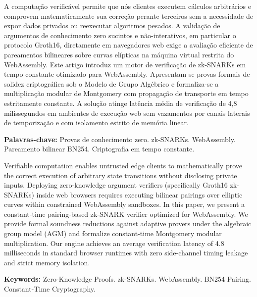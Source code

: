 \documentclass[
  article,
  12pt,
  oneside,
  a4paper,
  english,
  brazil
]{abntex2}
\begin{document}

\maketitle

\begin{resumoumacoluna}
A computação verificável permite que nós clientes executem cálculos arbitrários e comprovem matematicamente sua correção perante terceiros sem a necessidade de expor dados privados ou reexecutar algoritmos pesados. A validação de argumentos de conhecimento zero sucintos e não-interativos, em particular o protocolo Groth16, diretamente em navegadores web exige a avaliação eficiente de pareamentos bilineares sobre curvas elípticas na máquina virtual restrita do WebAssembly. Este artigo introduz um motor de verificação de zk-SNARKs em tempo constante otimizado para WebAssembly. Apresentam-se provas formais de solidez criptográfica sob o Modelo de Grupo Algébrico e formaliza-se a multiplicação modular de Montgomery com propagação de transporte em tempo estritamente constante. A solução atinge latência média de verificação de 4,8 milissegundos em ambientes de execução web sem vazamentos por canais laterais de temporização e com isolamento estrito de memória linear.

\vspace{\onelineskip}
\noindent
\textbf{Palavras-chave:} Provas de conhecimento zero. zk-SNARKs. WebAssembly. Pareamento bilinear BN254. Criptografia em tempo constante.
\end{resumoumacoluna}

\begin{resumoumacoluna}[Abstract]
Verifiable computation enables untrusted edge clients to mathematically prove the correct execution of arbitrary state transitions without disclosing private inputs. Deploying zero-knowledge argument verifiers (specifically Groth16 zk-SNARKs) inside web browsers requires executing bilinear pairings over elliptic curves within constrained WebAssembly sandboxes. In this paper, we present a constant-time pairing-based zk-SNARK verifier optimized for WebAssembly. We provide formal soundness reductions against adaptive provers under the algebraic group model (AGM) and formalize constant-time Montgomery modular multiplication. Our engine achieves an average verification latency of 4.8 milliseconds in standard browser runtimes with zero side-channel timing leakage and strict memory isolation.

\vspace{\onelineskip}
\noindent
\textbf{Keywords:} Zero-Knowledge Proofs. zk-SNARKs. WebAssembly. BN254 Pairing. Constant-Time Cryptography.
\end{resumoumacoluna}
\end{document}
